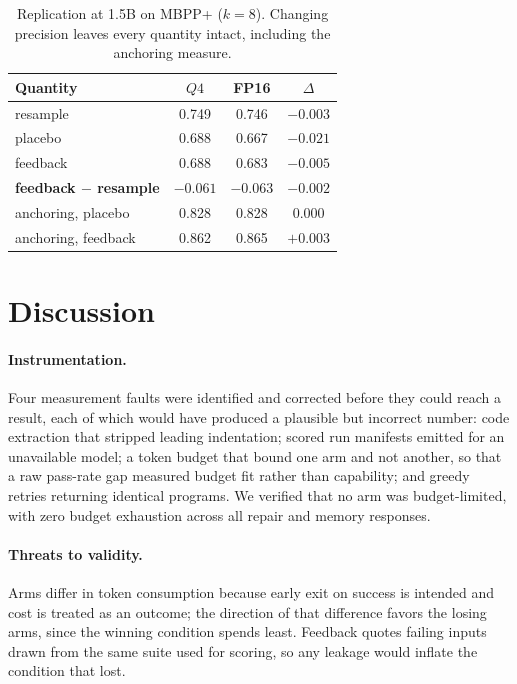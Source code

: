 \begin{table}[t]
  \centering
  \small
  \caption{Replication at 1.5B on MBPP+ ($k{=}8$). Changing precision leaves
  every quantity intact, including the anchoring measure.}
  \label{tab:replication}
  \begin{tabular}{lccc}
    \toprule
    Quantity & $Q4$ & FP16 & $\Delta$ \\
    \midrule
    resample                 & 0.749 & 0.746 & $-0.003$ \\
    placebo                  & 0.688 & 0.667 & $-0.021$ \\
    feedback                 & 0.688 & 0.683 & $-0.005$ \\
    \textbf{feedback $-$ resample} & $\mathbf{-0.061}$ & $\mathbf{-0.063}$ & $-0.002$ \\
    \midrule
    anchoring, placebo       & 0.828 & 0.828 & $0.000$ \\
    anchoring, feedback      & 0.862 & 0.865 & $+0.003$ \\
    \bottomrule
  \end{tabular}
\end{table}

\section{Discussion}
\label{sec:discussion}

\paragraph{Instrumentation.}
Four measurement faults were identified and corrected before they could reach a
result, each of which would have produced a plausible but incorrect number:
code extraction that stripped leading indentation; scored run manifests emitted
for an unavailable model; a token budget that bound one arm and not another, so
that a raw pass-rate gap measured budget fit rather than capability; and greedy
retries returning identical programs. We verified that no arm was
budget-limited, with zero budget exhaustion across all repair and memory
responses.

\paragraph{Threats to validity.}
Arms differ in token consumption because early exit on success is intended and
cost is treated as an outcome; the direction of that difference favors the
losing arms, since the winning condition spends least. Feedback quotes failing
inputs drawn from the same suite used for scoring, so any leakage would inflate
the condition that lost.

